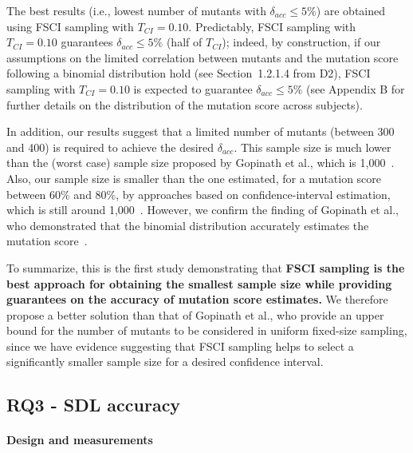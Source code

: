 The best results (i.e., lowest number of mutants with $\delta_{acc} \le 5\%$) are obtained using  FSCI sampling with $T_\mathit{CI}=0.10$. Predictably, FSCI sampling with $T_\mathit{CI}=0.10$ guarantees $\delta_{acc} \le 5\%$ (half of $T_\mathit{CI}$); indeed, by construction, if our assumptions 
on the limited correlation between mutants and the mutation score following a  binomial distribution hold (see Section~1.2.1.4 from D2),
FSCI sampling with $T_\mathit{CI}=0.10$ is expected to guarantee $\delta_{acc} \le 5\%$ (see Appendix
B
for further details on the distribution of the mutation score across subjects).

In addition, our results suggest that a limited number of mutants (between 300 and 400) is required to achieve the desired $\delta_{acc}$. This sample size is much lower than the (worst case) sample size proposed by Gopinath et al., which is 1,000~\cite{gopinath2015hard}. Also, our sample size is smaller 
than the one estimated, for a mutation score between 60\% and 80\%, by 
approaches
based on confidence-interval estimation, which is still around 1,000~\cite{Goncalves2012}. 
However, we confirm the finding of Gopinath et al., who demonstrated that the binomial distribution %
accurately estimates the mutation score~\cite{gopinath2015hard}.

To summarize, this is the first study demonstrating that \textbf{FSCI sampling is the 
best approach for obtaining the smallest sample size
while providing guarantees on the accuracy of mutation score estimates.} 
We therefore propose a better solution than that of Gopinath et al., who provide an upper bound for the number of mutants to be considered in uniform fixed-size sampling, since we have evidence suggesting that FSCI sampling helps to select a significantly smaller sample size for a desired confidence interval.





\subsection{RQ3 - SDL accuracy}



\paragraph{Design and measurements}


